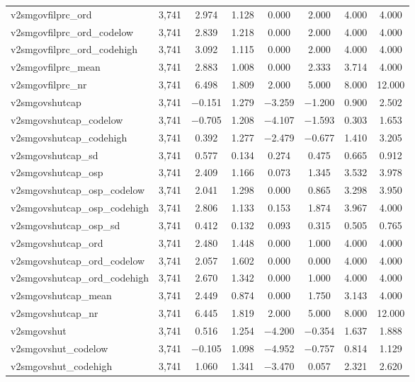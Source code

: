 \begin{table}[!htbp]
\begin{tabular}{@{\extracolsep{5pt}}lccccccc}
v2smgovfilprc\_ord & 3,741 & 2.974 & 1.128 & 0.000 & 2.000 & 4.000 & 4.000 \\ 
v2smgovfilprc\_ord\_codelow & 3,741 & 2.839 & 1.218 & 0.000 & 2.000 & 4.000 & 4.000 \\ 
v2smgovfilprc\_ord\_codehigh & 3,741 & 3.092 & 1.115 & 0.000 & 2.000 & 4.000 & 4.000 \\ 
v2smgovfilprc\_mean & 3,741 & 2.883 & 1.008 & 0.000 & 2.333 & 3.714 & 4.000 \\ 
v2smgovfilprc\_nr & 3,741 & 6.498 & 1.809 & 2.000 & 5.000 & 8.000 & 12.000 \\ 
v2smgovshutcap & 3,741 & $-$0.151 & 1.279 & $-$3.259 & $-$1.200 & 0.900 & 2.502 \\ 
v2smgovshutcap\_codelow & 3,741 & $-$0.705 & 1.208 & $-$4.107 & $-$1.593 & 0.303 & 1.653 \\ 
v2smgovshutcap\_codehigh & 3,741 & 0.392 & 1.277 & $-$2.479 & $-$0.677 & 1.410 & 3.205 \\ 
v2smgovshutcap\_sd & 3,741 & 0.577 & 0.134 & 0.274 & 0.475 & 0.665 & 0.912 \\ 
v2smgovshutcap\_osp & 3,741 & 2.409 & 1.166 & 0.073 & 1.345 & 3.532 & 3.978 \\ 
v2smgovshutcap\_osp\_codelow & 3,741 & 2.041 & 1.298 & 0.000 & 0.865 & 3.298 & 3.950 \\ 
v2smgovshutcap\_osp\_codehigh & 3,741 & 2.806 & 1.133 & 0.153 & 1.874 & 3.967 & 4.000 \\ 
v2smgovshutcap\_osp\_sd & 3,741 & 0.412 & 0.132 & 0.093 & 0.315 & 0.505 & 0.765 \\ 
v2smgovshutcap\_ord & 3,741 & 2.480 & 1.448 & 0.000 & 1.000 & 4.000 & 4.000 \\ 
v2smgovshutcap\_ord\_codelow & 3,741 & 2.057 & 1.602 & 0.000 & 0.000 & 4.000 & 4.000 \\ 
v2smgovshutcap\_ord\_codehigh & 3,741 & 2.670 & 1.342 & 0.000 & 1.000 & 4.000 & 4.000 \\ 
v2smgovshutcap\_mean & 3,741 & 2.449 & 0.874 & 0.000 & 1.750 & 3.143 & 4.000 \\ 
v2smgovshutcap\_nr & 3,741 & 6.445 & 1.819 & 2.000 & 5.000 & 8.000 & 12.000 \\ 
v2smgovshut & 3,741 & 0.516 & 1.254 & $-$4.200 & $-$0.354 & 1.637 & 1.888 \\ 
v2smgovshut\_codelow & 3,741 & $-$0.105 & 1.098 & $-$4.952 & $-$0.757 & 0.814 & 1.129 \\ 
v2smgovshut\_codehigh & 3,741 & 1.060 & 1.341 & $-$3.470 & 0.057 & 2.321 & 2.620 \\ 

\end{tabular}
\end{table}
